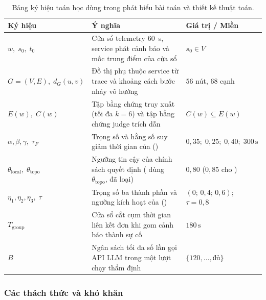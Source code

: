 \begin{table}[H]
  \centering
  \caption{Bảng ký hiệu toán học dùng trong phát biểu bài toán và thiết kế thuật toán.}
  \label{tab:ch4-ky-hieu}
  \tblfont
  \tblsetup
  \begin{tabularx}{\linewidth}{|l|Y|l|}
    \hline
    \textbf{Ký hiệu} & \textbf{Ý nghĩa} & \textbf{Giá trị / Miền} \\
    \hline
    $w,\; s_0,\; t_0$ & Cửa sổ telemetry 60~s, service phát cảnh báo và mốc trung điểm của cửa sổ & $s_0 \in V$ \\
    \hline
    $G = (V, E),\; d_G(u, v)$ & Đồ thị phụ thuộc service từ trace và khoảng cách bước nhảy vô hướng & $56$ nút, $68$ cạnh \\
    \hline
    $E(w),\; C(w)$ & Tập bằng chứng truy xuất (tối đa $k = 6$) và tập bằng chứng judge trích dẫn & $C(w) \subseteq E(w)$ \\
    \hline
    $\alpha, \beta, \gamma,\; \tau_F$ & Trọng số và hằng số suy giảm thời gian của  () & $0{,}35;\; 0{,}25;\; 0{,}40;\; 300\,\text{s}$ \\
    \hline
    $\theta_{\text{local}},\; \theta_{\text{topo}}$ & Ngưỡng tin cậy của chính sách quyết định ( dùng $\theta_{\text{topo}}$, đã loại) & $0{,}80$ ($0{,}85$ cho ) \\
    \hline
    $\eta_1, \eta_2, \eta_3,\; \tau$ & Trọng số ba thành phần và ngưỡng kích hoạt của  () & $(0;\, 0{,}4;\, 0{,}6)$;\; $\tau = 0{,}8$ \\
    \hline
    $T_{\text{group}}$ & Cửa sổ cắt cụm thời gian liên kết đơn khi gom cảnh báo thành sự cố & $180\,\text{s}$ \\
    \hline
    $B$ & Ngân sách tối đa số lần gọi API LLM trong một lượt chạy thẩm định & $\{120, \dots, \text{đủ}\}$ \\
    \hline
  \end{tabularx}
\end{table}

\subsubsection{Các thách thức và khó khăn}
\label{sec:ch4-thach-thuc}


